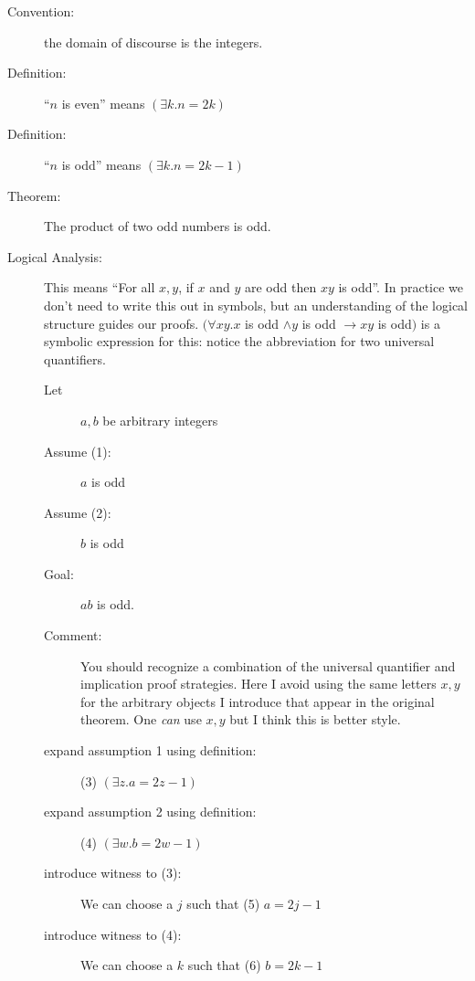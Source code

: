 \documentclass[12pt]{article}
\begin{document}
\begin{description}

\item[Convention:] the domain of discourse is the integers.

\item[Definition:]  ``$n$ is even'' means $(\exists k.n=2k)$

\item[Definition:]  ``$n$ is odd'' means $(\exists k.n=2k-1)$

\item[Theorem:]  The product of two odd numbers is odd.

\item[Logical Analysis:] This means ``For all $x,y$, if $x$ and $y$ are
odd then $xy$ is odd''.  In practice we don't need to write this out
in symbols, but an understanding of the logical structure guides our
proofs.  $(\forall xy. x$ is odd $\wedge y$ is odd $\rightarrow xy$
is odd$)$ is a symbolic expression for this: notice the abbreviation
for two universal quantifiers.

\begin{description}

\item[Let] $a,b$ be arbitrary integers

\item [Assume (1):]  $a$ is odd

\item [Assume (2):]  $b$ is odd

\item[Goal:]  $ab$ is odd.

\item[Comment:]  You should recognize a combination of the universal quantifier and implication proof strategies.  Here I avoid using the same letters $x,y$ for the arbitrary objects I introduce that appear in the original theorem.  One {\em can\/} use $x,y$ but I think this is better style.

\item [expand assumption 1 using definition:]  (3) $(\exists z.a=2z-1)$

\item [expand assumption 2 using definition:]  (4) $(\exists w.b=2w-1)$

\item [introduce witness to (3):]  We can choose a $j$ such that (5) $a=2j-1$

\item [introduce witness to (4):]  We can choose a $k$ such that (6) $b=2k-1$


\end{description}
\end{description}
\end{document}
